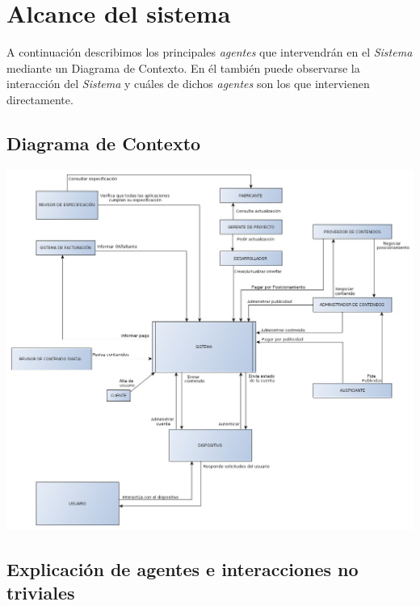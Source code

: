 \documentclass[11pt, a4paper, spanish]{article}
\begin{document}
\section{Alcance del sistema}

	A continuaci\'on describimos los principales \emph{agentes} que intervendr\'an en el \emph{Sistema} mediante un Diagrama de Contexto.
	En \'el tambi\'en puede observarse la interacci\'on del \emph{Sistema} y cu\'ales de dichos \emph{agentes} son los que intervienen directamente.

\subsection{Diagrama de Contexto}

	\begin{center}
		\includegraphics[scale=0.35]{Diagramas/DiagramaContexto.png}
	\end{center}

\newpage

\subsection{Explicaci\'on de agentes e interacciones no triviales}
\end{document}
